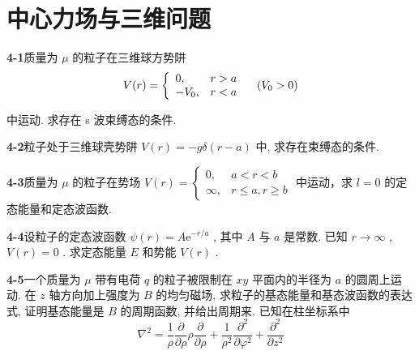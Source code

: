 \chapter{中心力场与三维问题}

\newpage


\textbf{4-1}\quad 质量为 $\displaystyle \mu$ 的粒子在三维球方势阱
$$
V (r) = \left\{ \begin{array}{l l} 0, & r > a \\ - V _ {0}, & r <   a \end{array} \right. \quad (V _ {0} > 0)
$$

中运动. 求存在 s 波束缚态的条件.

\vfill

\newpage

\textbf{4-2}\quad 粒子处于三维球壳势阱 $\displaystyle V(r) = -g\delta(r - a)$ 中, 求存在束缚态的条件.

\vfill

\newpage

\textbf{4-3}\quad 质量为 $\displaystyle \mu$ 的粒子在势场 $\displaystyle V(r) = \left\{ \begin{array}{ll}0, & a < r < b\\ \infty , & r\leqslant a,r\geqslant b \end{array} \right.$ 中运动，求 $\displaystyle l = 0$ 的定态能量和定态波函数.

\vfill

\newpage

\textbf{4-4}\quad 设粒子的定态波函数 $\displaystyle \psi(r) = A\mathrm{e}^{-r / a}$ , 其中 $\displaystyle A$ 与 $\displaystyle a$ 是常数. 已知 $\displaystyle r \to \infty$ , $\displaystyle V(r) = 0$ . 求定态能量 $\displaystyle E$ 和势能 $\displaystyle V(r)$ .

\vfill

\newpage

\textbf{4-5}\quad 一个质量为 $\displaystyle \mu$ 带有电荷 $\displaystyle q$ 的粒子被限制在 $\displaystyle xy$ 平面内的半径为 $\displaystyle a$ 的圆周上运动. 在 $\displaystyle z$ 轴方向加上强度为 $\displaystyle B$ 的均匀磁场, 求粒子的基态能量和基态波函数的表达式, 证明基态能量是 $\displaystyle B$ 的周期函数, 并给出周期来. 已知在柱坐标系中
\begin{equation*}
\nabla^ {2} = \dfrac {1}{\rho} \dfrac {\partial}{\partial \rho} \rho \dfrac {\partial}{\partial \rho} + \dfrac {1}{\rho^ {2}} \dfrac {\partial^ {2}}{\partial \varphi^ {2}} + \dfrac {\partial^ {2}}{\partial z ^ {2}}
\end{equation*}

